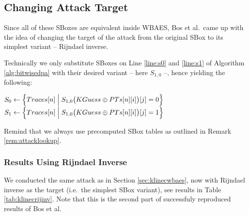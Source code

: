 
\subsection{Changing Attack Target}
\label{sec:rijinv}

Since all of these SBoxes are equivalent inside WBAES, Bos et al.\ came up with the idea of changing the target of the attack from the original SBox to its simplest variant -- Rijndael inverse.

\begin{remark}
\label{rem:spq}
	Technically we only substitute SBoxes on Line \ref{line:s0} and \ref{line:s1} of Algorithm \ref{alg:bitwisedpa} with their desired variant -- here $S_{1,0}$ --, hence yielding the following:
	\begin{algorithmic}[1]
		\setcounter{ALG@line}{5}
		\State $S_0 \gets \Bigl\{ Traces[n] \Bigm| S_{1,0}\bigl(KGuess\oplus PTs[n][i]\bigr)[j] = 0 \Bigr\}$
		\State $S_1 \gets \Bigl\{ Traces[n] \Bigm| S_{1,0}\bigl(KGuess\oplus PTs[n][i]\bigr)[j] = 1 \Bigr\}$
	\end{algorithmic}
	Remind that we always use precomputed SBox tables as outlined in Remark \ref{rem:attacklookup}.
\end{remark}

\subsubsection{Results Using Rijndael Inverse}
	
	We conducted the same attack as in Section \ref{sec:klinecwbaes}, now with Rijndael inverse as the target (i.e.\ the simplest SBox variant), see results in Table \ref{tab:klinecrijinv}. Note that this is the second part of successfuly reproduced results of Bos et al.
	
	
